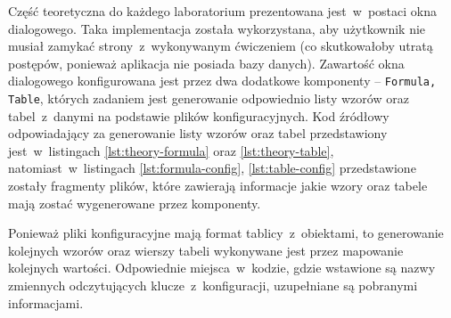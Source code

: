 Część teoretyczna do każdego laboratorium prezentowana jest~w~postaci okna dialogowego. Taka
implementacja została wykorzystana, aby użytkownik nie musiał zamykać strony~z~wykonywanym
ćwiczeniem (co skutkowałoby utratą postępów, ponieważ aplikacja nie posiada bazy danych). Zawartość
okna dialogowego konfigurowana jest przez dwa dodatkowe komponenty -- \texttt{Formula, Table},
których zadaniem jest generowanie odpowiednio listy wzorów oraz tabel~z~danymi na podstawie plików
konfiguracyjnych. Kod źródłowy odpowiadający za generowanie listy wzorów oraz tabel przedstawiony
jest~w~listingach \ref{lst:theory-formula} oraz \ref{lst:theory-table}, natomiast~w~listingach
\ref{lst:formula-config}, \ref{lst:table-config} przedstawione zostały fragmenty plików, które
zawierają informacje jakie wzory oraz tabele mają zostać wygenerowane przez komponenty.





Ponieważ pliki konfiguracyjne mają format tablicy~z~obiektami, to generowanie kolejnych wzorów oraz
wierszy tabeli wykonywane jest przez mapowanie kolejnych wartości. Odpowiednie miejsca~w~kodzie,
gdzie wstawione są nazwy zmiennych odczytujących klucze~z~konfiguracji, uzupełniane są pobranymi
informacjami.